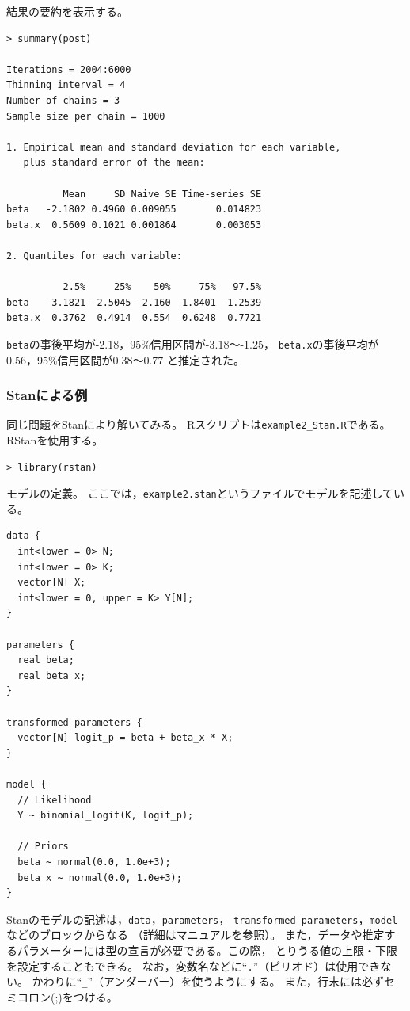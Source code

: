 \documentclass[11pt,uplatex]{jsarticle}
\begin{document}

結果の要約を表示する。
\begin{lstlisting}
> summary(post)

Iterations = 2004:6000
Thinning interval = 4 
Number of chains = 3 
Sample size per chain = 1000 

1. Empirical mean and standard deviation for each variable,
   plus standard error of the mean:

          Mean     SD Naive SE Time-series SE
beta   -2.1802 0.4960 0.009055       0.014823
beta.x  0.5609 0.1021 0.001864       0.003053

2. Quantiles for each variable:

          2.5%     25%    50%     75%   97.5%
beta   -3.1821 -2.5045 -2.160 -1.8401 -1.2539
beta.x  0.3762  0.4914  0.554  0.6248  0.7721

\end{lstlisting}

\noindent
\texttt{beta}の事後平均が-2.18，95\%信用区間が-3.18〜-1.25，
\texttt{beta.x}の事後平均が0.56，95\%信用区間が0.38〜0.77
と推定された。


\subsubsection{Stanによる例}
同じ問題を\textsf{Stan}により解いてみる。
\textsf{R}スクリプトは\texttt{example2\_Stan.R}である。
RStanを使用する。
%
\begin{lstlisting}
> library(rstan)
\end{lstlisting}

モデルの定義。
ここでは，\texttt{example2.stan}というファイルでモデルを記述している。
%
\begin{lstlisting}
data {
  int<lower = 0> N;
  int<lower = 0> K;
  vector[N] X;
  int<lower = 0, upper = K> Y[N];
}

parameters {
  real beta;
  real beta_x;
}

transformed parameters {
  vector[N] logit_p = beta + beta_x * X;
}

model {
  // Likelihood
  Y ~ binomial_logit(K, logit_p);

  // Priors
  beta ~ normal(0.0, 1.0e+3);
  beta_x ~ normal(0.0, 1.0e+3);
}
\end{lstlisting}
\noindent
Stanのモデルの記述は，\texttt{data}，\texttt{parameters}，
\texttt{transformed parameters}，\texttt{model}などのブロックからなる
（詳細はマニュアルを参照）。
また，データや推定するパラメーターには型の宣言が必要である。この際，
とりうる値の上限・下限を設定することもできる。
なお，変数名などに``\texttt{.}''（ピリオド）は使用できない。
かわりに``\texttt{\_}''（アンダーバー）を使うようにする。
また，行末には必ずセミコロン(;)をつける。
\end{document}
